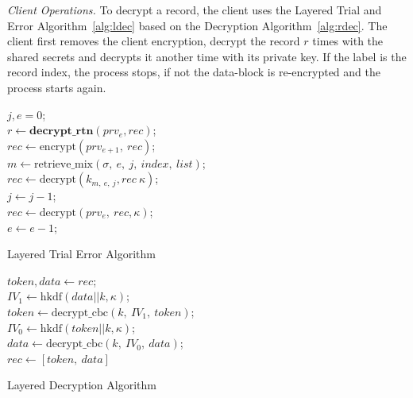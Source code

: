 \documentclass[USenglish,oneside,twocolumn]{article}
\begin{document}
\noindent\textit{Client Operations.} To decrypt a record, the client uses the Layered Trial and Error Algorithm~\ref{alg:ldec} based on the Decryption Algorithm~\ref{alg:rdec}. The client first removes the client encryption, decrypt the record $r$ times with the shared secrets and decrypts it another time with its private key. If the label is the record index, the process stops, if not the data-block is re-encrypted and the process starts again.

\begin{algorithm}
\DontPrintSemicolon
{}
$j,e=0$;\\
$r\gets \textbf{decrypt\_rtn}(prv_e,rec)$;\\
{
{
$rec \gets \text{encrypt}(prv_{e+1},\ rec)$;\\
}
{
	$m\gets \text{retrieve\_mix}(\sigma,\ e,\ j,\ index,\ list)$;\\
	$rec \gets \text{decrypt}(k_{m,\ e,\ j}, rec\ \kappa)$;\\
	$j\gets j-1$;\\
}
	$rec \gets \text{decrypt}(prv_e,\ rec, \kappa)$;\\
    $e\gets e-1$;\\
}
\caption{Layered Trial Error Algorithm}
\label{alg:ldec}
\end{algorithm}

\begin{algorithm}
\DontPrintSemicolon
{}
$token, data \gets rec$;\\
$IV_1 \gets \text{hkdf}(data || k, \kappa)$;\\
$token \gets \text{decrypt\_cbc}\left(k,\ IV_1,\ token \right )$;\\
$IV_0 \gets \text{hkdf}(token || k, \kappa)$;\\
$data \gets \text{decrypt\_cbc}\left(k,\ IV_0,\ data \right )$;\\
$rec \gets [token,\ data]$\\
\caption{Layered Decryption Algorithm}
\label{alg:ldecp}
\end{algorithm}
\end{document}
